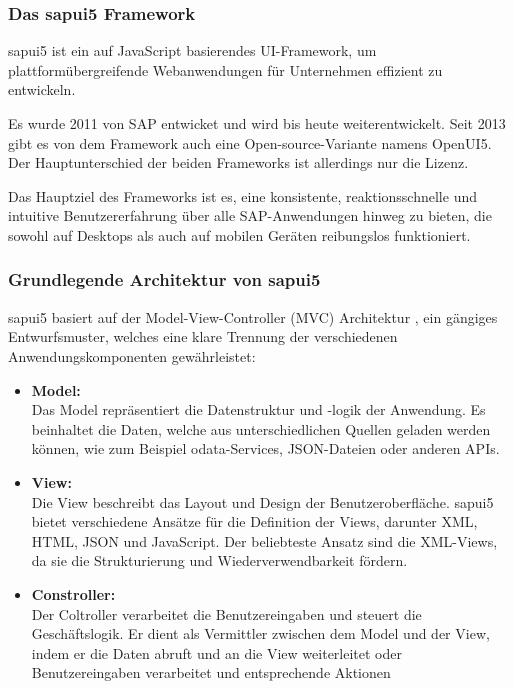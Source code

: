 \subsubsection[Das \gls{sapui5} Framework]{Das \gls{sapui5} Framework}
\gls{sapui5} ist ein auf JavaScript basierendes UI-Framework, um plattformübergreifende Webanwendungen für Unternehmen effizient zu entwickeln.

Es wurde 2011 von SAP entwicket und wird bis heute weiterentwickelt. Seit 2013 gibt es von dem Framework auch eine Open-source-Variante namens OpenUI5. Der Hauptunterschied der beiden Frameworks ist allerdings nur die Lizenz.

Das Hauptziel des Frameworks ist es, eine konsistente, reaktionsschnelle und intuitive Benutzererfahrung über alle SAP-Anwendungen hinweg zu bieten, die sowohl auf Desktops als auch auf mobilen Geräten reibungslos funktioniert.

\subsubsection[Grundlegende Architektur von \gls{sapui5}]{Grundlegende Architektur von \gls{sapui5}}
\gls{sapui5} basiert auf der Model-View-Controller (MVC) Architektur \cite{ui5_mvc}, ein gängiges Entwurfsmuster, welches eine klare Trennung der verschiedenen Anwendungskomponenten gewährleistet:
\begin{itemize}
    \item \textbf{Model:} \\
    Das Model repräsentiert die Datenstruktur und -logik der Anwendung. Es beinhaltet die Daten, welche aus unterschiedlichen Quellen geladen werden können, wie zum Beispiel \gls{odata}-Services, JSON-Dateien oder anderen APIs.
    \item \textbf{View:} \\
    Die View beschreibt das Layout und Design der Benutzeroberfläche. \gls{sapui5} bietet verschiedene Ansätze für die Definition der Views, darunter XML, HTML, JSON und JavaScript.
    Der beliebteste Ansatz sind die XML-Views, da sie die Strukturierung und Wiederverwendbarkeit fördern.
    \item \textbf{Constroller:} \\
    Der Coltroller verarbeitet die Benutzereingaben und steuert die Geschäftslogik.
    Er dient als Vermittler zwischen dem Model und der View, indem er die Daten abruft und an die View weiterleitet oder Benutzereingaben verarbeitet und entsprechende Aktionen 
\end{itemize}

